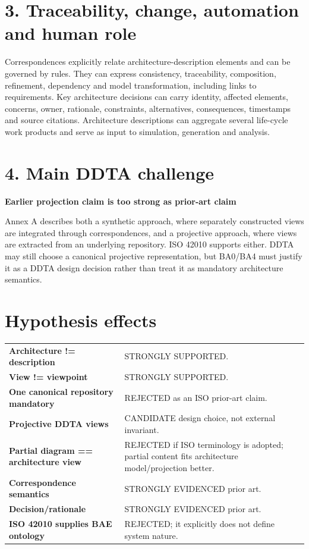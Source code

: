 \documentclass[10pt,a4paper]{article}
\newenvironment{challenge}[1]{\def\FrameCommand{\fcolorbox{ddtaorange}{ddtagray}}\MakeFramed{\advance\hsize-2\width\FrameRestore}\noindent\textbf{#1}\par\smallskip}{\endMakeFramed}
\begin{document}
\section{3. Traceability, change, automation and human role}
Correspondences explicitly relate architecture-description elements and can be governed by rules. They can express consistency, traceability, composition, refinement, dependency and model transformation, including links to requirements. Key architecture decisions can carry identity, affected elements, concerns, owner, rationale, constraints, alternatives, consequences, timestamps and source citations. Architecture descriptions can aggregate several life-cycle work products and serve as input to simulation, generation and analysis.
\section{4. Main DDTA challenge}
\begin{challenge}{Earlier projection claim is too strong as prior-art claim}
Annex A describes both a synthetic approach, where separately constructed views are integrated through correspondences, and a projective approach, where views are extracted from an underlying repository. ISO 42010 supports either. DDTA may still choose a canonical projective representation, but BA0/BA4 must justify it as a DDTA design decision rather than treat it as mandatory architecture semantics.
\end{challenge}
\section{Hypothesis effects}
\begin{tabularx}{\linewidth}{>{\bfseries}p{4.5cm}X}
Architecture != description & STRONGLY SUPPORTED.\\
View != viewpoint & STRONGLY SUPPORTED.\\
One canonical repository mandatory & REJECTED as an ISO prior-art claim.\\
Projective DDTA views & CANDIDATE design choice, not external invariant.\\
Partial diagram == architecture view & REJECTED if ISO terminology is adopted; partial content fits architecture model/projection better.\\
Correspondence semantics & STRONGLY EVIDENCED prior art.\\
Decision/rationale & STRONGLY EVIDENCED prior art.\\
ISO 42010 supplies BAE ontology & REJECTED; it explicitly does not define system nature.\\
\end{tabularx}
\end{document}
